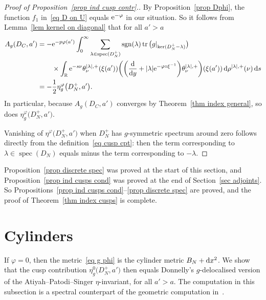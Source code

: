 \documentclass[pdftex]{sigma}%
\numberwithin{equation}{section}
\DeclareMathOperator{\tr}{tr}
\DeclareMathOperator{\spec}{spec}
\DeclareMathOperator{\sgn}{sgn}
\newcommand{\R}{\mathbb{R}}
\begin{document}
\begin{proof}[Proof of Proposition~\ref{prop ind cusp contr}.]
By Proposition~\ref{prop Dphi}, the function $f_1$ in~\eqref{eq D on U} equals ${\rm e}^{-\varphi}$ in our situation. So it
 follows from Lemma~\ref{lem kernel on diagonal} that for all $a'>a$
 \begin{align}
 A_{g}(D_C, a') = - &{\rm e}^{-p \varphi(a')} \int_{0}^{\infty}
\sum_{\lambda \in \spec(D_N^+)}\sgn(\lambda)\tr\big(g|_{\ker(D_N^+ - \lambda)}\big)\nonumber
\\
&\times\int_{\R}{\rm e}^{-s\nu} \theta^{|\lambda|, +}_{\nu} (\xi(a')) \bigg( \bigg( \frac{\rm d}{{\rm d}y}+|\lambda| {\rm e}^{-\varphi \circ \xi^{-1}}\bigg) \theta^{|\lambda|, +}_{\nu} \bigg)(\xi(a'))\,{\rm d}\rho^{|\lambda|, +}(\nu) \, {\rm d}s\nonumber
 \\
 =-&\frac{1}{2}\eta_g^{\varphi}\big(D_N^+, a'\big).
\label{eq comp Ag}
 \end{align}
 In particular, because $A_{g}(D_C, a')$ converges by Theorem~\ref{thm index general}, so does $\eta_g^{\varphi}\big(D_N^+, a'\big)$.

Vanishing of $\eta^{\varphi}\big(D_N^+, a'\big)$ when $D_N^+$ has $g$-symmetric spectrum around zero follows directly from the definition~\eqref{eq cusp cpt}: then the term corresponding to $\lambda \in \spec(D_N)$ equals minus the term corresponding to $-\lambda$.
\end{proof}

Proposition~\ref{prop discrete spec} was proved at the start of this section, and Proposition~\ref{prop ind cusps cond} was proved at the end of Section~\ref{sec adjoints}. So Propositions~\ref{prop ind cusps cond}--\ref{prop discrete spec} are proved, and the proof of Theorem~\ref{thm index cusps} is complete.

\section{Cylinders}%

If $\varphi = 0$, then the metric~\eqref{eq g phi} is the cylinder metric $B_N + {\rm d}x^2$. We show that the cusp contribution $\eta^0_g\big(D_N^+, a'\big)$ then equals Donnelly's $g$-delocalised version of the Atiyah--Patodi--Singer $\eta$-invariant, for all $a'>a$. The computation in this subsection is a spectral counterpart of the geometric computation in~\cite[Section~4]{HW21a}.
\end{document}
